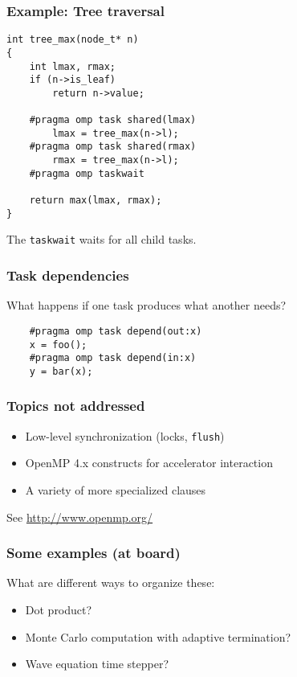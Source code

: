 \documentclass{beamer}
\begin{document}
\begin{frame}[fragile]
  \frametitle{Example: Tree traversal}

\begin{lstlisting}
int tree_max(node_t* n)
{
    int lmax, rmax;
    if (n->is_leaf)
        return n->value;
    
    #pragma omp task shared(lmax)
        lmax = tree_max(n->l);
    #pragma omp task shared(rmax)
        rmax = tree_max(n->l);
    #pragma omp taskwait

    return max(lmax, rmax);
}
\end{lstlisting}
The {\tt taskwait} waits for all child tasks.
\end{frame}


\begin{frame}[fragile]
  \frametitle{Task dependencies}

  What happens if one task produces what another needs?
\begin{lstlisting}
    #pragma omp task depend(out:x)
    x = foo();
    #pragma omp task depend(in:x)
    y = bar(x);
\end{lstlisting}

\end{frame}


\begin{frame}
  \frametitle{Topics not addressed}

  \begin{itemize}
  \item Low-level synchronization (locks, {\tt flush})
  \item OpenMP 4.x constructs for accelerator interaction
  \item A variety of more specialized clauses
  \end{itemize}
  See \url{http://www.openmp.org/}
\end{frame}


\begin{frame}
  \frametitle{Some examples (at board)}

  What are different ways to organize these:
  \begin{itemize}
  \item Dot product?
  \item Monte Carlo computation with adaptive termination?
  \item Wave equation time stepper?
  \end{itemize}
\end{frame}
\end{document}
